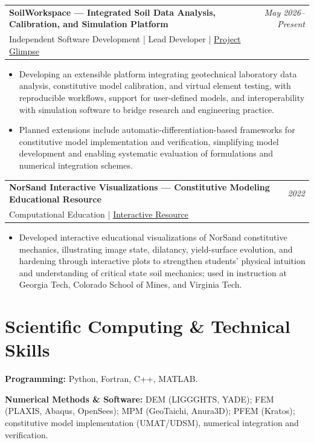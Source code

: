 \documentclass[10pt,letterpaper]{article}
\makeatletter
\newcommand{\entry}[3]{%
  \begin{tabularx}{\textwidth}{@{}X r@{}}
    \textbf{#1} & \textit{#3}\\[-1pt]
    \textcolor{midgray}{#2} &
  \end{tabularx}\vspace{-1pt}
}
\makeatother
\begin{document}
\vspace{2pt}
\entry{SoilWorkspace --- Integrated Soil Data Analysis,
Calibration, and Simulation Platform}
{Independent Software Development | Lead Developer |
\href{https://srinivas12viv.github.io/SoilWorkspace/}
{Project Glimpse}}
{May 2026--Present}
\begin{itemize}
    \item Developing an extensible platform integrating
    geotechnical laboratory data analysis, constitutive
    model calibration, and virtual element testing,
    with reproducible workflows, support for user-defined
    models, and interoperability with simulation software
    to bridge research and engineering practice.

    \item Planned extensions include automatic-differentiation-based
    frameworks for constitutive model implementation
    and verification, simplifying model development
    and enabling systematic evaluation of formulations
    and numerical integration schemes.
\end{itemize}

\vspace{2pt}
\entry{NorSand Interactive Visualizations ---
Constitutive Modeling Educational Resource}
{Computational Education |
\href{https://srinivas12viv.github.io/NorSand/}
{Interactive Resource}}
{2022}
\begin{itemize}
    \item Developed interactive educational visualizations
    of NorSand constitutive mechanics, illustrating image
    state, dilatancy, yield-surface evolution, and hardening
    through interactive plots to strengthen
    students' physical intuition and understanding of
    critical state soil mechanics; used in instruction
    at Georgia Tech, Colorado School of Mines, and
    Virginia Tech.
\end{itemize}



\section{Scientific Computing \& Technical Skills}

\textbf{Programming:}
Python, Fortran, C++, MATLAB.
\vspace{2pt}

\textbf{Numerical Methods \& Software:}
DEM (LIGGGHTS, YADE);
FEM (PLAXIS, Abaqus, OpenSees);
MPM (GeoTaichi, Anura3D);
PFEM (Kratos); constitutive model implementation
(UMAT/UDSM), numerical integration and verification.
\vspace{2pt}
\end{document}
